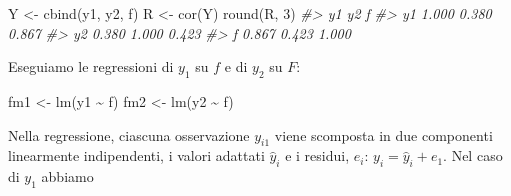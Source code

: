 \documentclass[
  11pt,
]{krantz}
\makeatletter
\newenvironment{Shaded}{\begin{snugshade}}{\end{snugshade}}
\newcommand{\AttributeTok}[1]{\textcolor[rgb]{0.61,0.61,0.61}{#1}}
\newcommand{\CommentTok}[1]{\textcolor[rgb]{0.37,0.37,0.37}{\textit{#1}}}
\newcommand{\DecValTok}[1]{\textcolor[rgb]{0.06,0.06,0.06}{#1}}
\newcommand{\FunctionTok}[1]{\textcolor[rgb]{0,0,0}{#1}}
\newcommand{\NormalTok}[1]{#1}
\newcommand{\OtherTok}[1]{\textcolor[rgb]{0.37,0.37,0.37}{#1}}
\newcommand{\SpecialCharTok}[1]{\textcolor[rgb]{0,0,0}{#1}}
\newenvironment{kframe}{%
\medskip{}
\setlength{\fboxsep}{.8em}
 \def\at@end@of@kframe{}%
 \ifinner\ifhmode%
  \def\at@end@of@kframe{\end{minipage}}%
  \begin{minipage}{\columnwidth}%
 \fi\fi%
 \def\FrameCommand##1{\hskip\@totalleftmargin \hskip-\fboxsep
 \colorbox{shadecolor}{##1}\hskip-\fboxsep
     \hskip-\linewidth \hskip-\@totalleftmargin \hskip\columnwidth}%
 \MakeFramed {\advance\hsize-\width
   \@totalleftmargin\z@ \linewidth\hsize
   \@setminipage}}%
 {\par\unskip\endMakeFramed%
 \at@end@of@kframe}
\renewenvironment{Shaded}{\begin{kframe}}{\end{kframe}}
\theoremstyle{definition}
\theoremstyle{definition}
\theoremstyle{definition}
\theoremstyle{definition}
\theoremstyle{remark}
\makeatother
\begin{document}
\begin{Shaded}
\begin{Highlighting}[]
\NormalTok{Y }\OtherTok{\textless{}{-}} \FunctionTok{cbind}\NormalTok{(y1, y2, f)}
\NormalTok{R }\OtherTok{\textless{}{-}} \FunctionTok{cor}\NormalTok{(Y)}
\FunctionTok{round}\NormalTok{(R, }\DecValTok{3}\NormalTok{)}
\CommentTok{\#\textgreater{}       y1    y2     f}
\CommentTok{\#\textgreater{} y1 1.000 0.380 0.867}
\CommentTok{\#\textgreater{} y2 0.380 1.000 0.423}
\CommentTok{\#\textgreater{} f  0.867 0.423 1.000}
\end{Highlighting}
\end{Shaded}

Eseguiamo le regressioni di \(y_1\) su \(f\) e di \(y_2\) su \(F\):

\begin{Shaded}
\begin{Highlighting}[]
\NormalTok{fm1 }\OtherTok{\textless{}{-}} \FunctionTok{lm}\NormalTok{(y1 }\SpecialCharTok{\textasciitilde{}}\NormalTok{ f)}
\NormalTok{fm2 }\OtherTok{\textless{}{-}} \FunctionTok{lm}\NormalTok{(y2 }\SpecialCharTok{\textasciitilde{}}\NormalTok{ f)}
\end{Highlighting}
\end{Shaded}

Nella regressione, ciascuna osservazione \(y_{i1}\) viene scomposta in due componenti linearmente indipendenti, i valori adattati \(\hat{y}_{i}\) e i residui, \(e_{i}\): \(y_i = \hat{y}_i + e_1\). Nel caso di \(y_1\) abbiamo

\begin{Shaded}
\end{Shaded}
\end{document}
